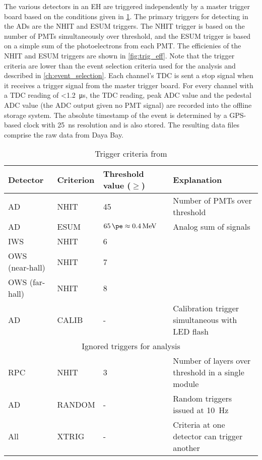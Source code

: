 The various detectors in an EH are triggered independently
by a master trigger board based on the conditions given in \cref{tab:trigger}.
The primary triggers for detecting \nuebar{} in the ADs are the NHIT and ESUM triggers.
The NHIT trigger is based on the number of PMTs simultaneously over threshold,
and the ESUM trigger is based on a simple sum of the photoelectrons
from each PMT.
The efficienies of the NHIT and ESUM triggers are shown in \cref{fig:trig_eff}.
Note that the trigger criteria are lower than the event selection
criteria used for the \thetaot{} analysis and described in \cref{ch:event_selection}.
Each channel's TDC is sent a stop signal when it receives a trigger signal
from the master trigger board.
For every channel with a TDC reading of \SI{<1.2}{\us},
the TDC reading, peak ADC value and the pedestal ADC value
(the ADC output given no PMT signal)
are recorded into the offline storage system.
The absolute timestamp of the event is determined by a GPS-based clock
with \SI{25}{\ns} resolution and is also stored.
The resulting data files comprise the raw data from Daya Bay.


\begin{table}[ht]
    \centering
    \begin{tabular}[t]{lllp{6cm}}
        \hline
        Detector & Criterion & Threshold value ($\geq$) & Explanation\\
        \hline
        AD & NHIT & \num{45} & Number of PMTs over threshold \\
        AD & ESUM & $\SI{65}{\pe}\approx \SI{0.4}{\MeV}$ & Analog sum of signals \\
        IWS & NHIT & \num{6} & \\
        OWS (near-hall) & NHIT & \num{7} & \\
        OWS (far-hall) & NHIT & \num{8} & \\
        AD & CALIB & - & Calibration trigger simultaneous with LED flash \\
        \hline
        \multicolumn{4}{c}{Ignored triggers for \thetaot{} analysis} \\
                       \hline
        RPC & NHIT & \num{3} & Number of layers over threshold in a single module \\
        AD & RANDOM & - & Random triggers issued at \SI{10}{\Hz} \\
        All & XTRIG & - & Criteria at one detector can trigger another \\
        \hline
    \end{tabular}
    \caption{Trigger criteria from \cite{ngd2016}}
    \label{tab:trigger}
\end{table}


